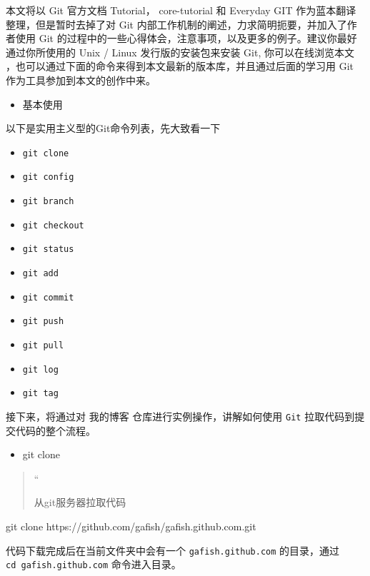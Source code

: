 \documentclass[
]{article}
\newenvironment{Shaded}{}{}
\newcommand{\NormalTok}[1]{#1}
\begin{document}
本文将以 Git 官方文档 Tutorial， core-tutorial 和 Everyday GIT
作为蓝本翻译整理，但是暂时去掉了对 Git
内部工作机制的阐述，力求简明扼要，并加入了作者使用 Git
的过程中的一些心得体会，注意事项，以及更多的例子。建议你最好通过你所使用的
Unix / Linux 发行版的安装包来安装 Git, 你可以在线浏览本文
，也可以通过下面的命令来得到本文最新的版本库，并且通过后面的学习用 Git
作为工具参加到本文的创作中来。

\begin{itemize}
\item
  基本使用
\end{itemize}

以下是实用主义型的Git命令列表，先大致看一下

\begin{itemize}
\item
  \texttt{git\ clone}
\item
  \texttt{git\ config}
\item
  \texttt{git\ branch}
\item
  \texttt{git\ checkout}
\item
  \texttt{git\ status}
\item
  \texttt{git\ add}
\item
  \texttt{git\ commit}
\item
  \texttt{git\ push}
\item
  \texttt{git\ pull}
\item
  \texttt{git\ log}
\item
  \texttt{git\ tag}
\end{itemize}

接下来，将通过对 我的博客 仓库进行实例操作，讲解如何使用 \texttt{Git}
拉取代码到提交代码的整个流程。

\begin{itemize}
\item
  git clone
\end{itemize}

\begin{quote}
``

从git服务器拉取代码
\end{quote}

\begin{Shaded}
\begin{Highlighting}[]
\NormalTok{git clone https://github.com/gafish/gafish.github.com.git}
\end{Highlighting}
\end{Shaded}

代码下载完成后在当前文件夹中会有一个 \texttt{gafish.github.com}
的目录，通过 \texttt{cd\ gafish.github.com} 命令进入目录。
\end{document}
